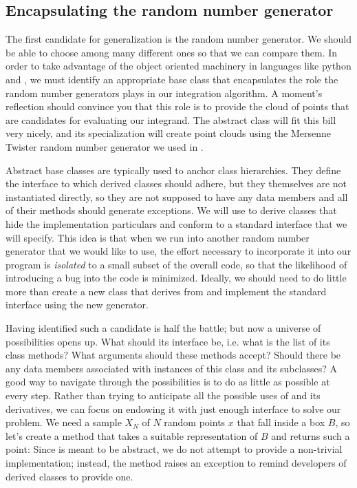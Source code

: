 \subsection{Encapsulating the random number generator}
\label{sec:classes:pointcloud}

The first candidate for generalization is the random number generator. We should be able to
choose among many different ones so that we can compare them. In order to take advantage of the
object oriented machinery in languages like python and \cpp, we must identify an appropriate
base class that encapsulates the role the random number generators plays in our integration
algorithm. A moment's reflection should convince you that this role is to provide the cloud of
points that are candidates for evaluating our integrand. The abstract class 
will fit this bill very nicely, and its specialization  will create point
clouds using the Mersenne Twister random number generator we used in . 

Abstract base classes are typically used to anchor class hierarchies. They define the interface
to which derived classes should adhere, but they themselves are not instantiated directly, so
they are not supposed to have any data members and all of their methods should generate
exceptions. We will use  to derive classes that hide the implementation
particulars and conform to a standard interface that we will specify.  This idea is that when
we run into another random number generator that we would like to use, the effort necessary to
incorporate it into our program is {\em isolated} to a small subset of the overall code, so
that the likelihood of introducing a bug into the code is minimized.  Ideally, we should need
to do little more than create a new class that derives from  and implement
the standard interface using the new generator.

Having identified such a candidate is half the battle; but now a universe of possibilities
opens up. What should its interface be, i.e. what is the list of its class methods? What
arguments should these methods accept? Should there be any data members associated with
instances of this class and its subclasses? A good way to navigate through the possibilities is
to do as little as possible at every step. Rather than trying to anticipate all the possible
uses of  and its derivatives, we can focus on endowing it with just enough
interface to solve our problem. We need a sample $X_{N}$ of $N$ random points $x$ that fall
inside a box $B$, so let's create a method  that takes a suitable representation
of $B$ and returns such a point:
%
%
Since  is meant to be abstract, we do not attempt to provide a non-trivial
implementation; instead, the method  raises an exception to remind developers of
derived classes to provide one.

